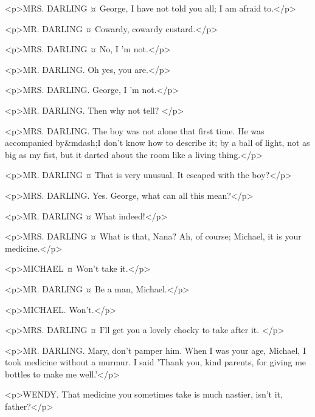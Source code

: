 
<p>MRS. DARLING ¤
George, I have not told you all; I am afraid to.</p>

<p>MR. DARLING ¤
Cowardy, cowardy custard.</p>

<p>MRS. DARLING ¤
No, I 'm not.</p>

<p>MR. DARLING. Oh yes, you are.</p>

<p>MRS. DARLING. George, I 'm not.</p>

<p>MR. DARLING. Then why not tell?
</p>

<p>MRS. DARLING. The boy was not alone that first time. He was accompanied by&mdash;I don't know how to describe it; by a ball of light, not as big as my fist, but it darted about the room like a living thing.</p>

<p>MR. DARLING ¤
That is very unusual. It escaped with the boy?</p>

<p>MRS. DARLING. Yes.
George, what can all this mean?</p>

<p>MR. DARLING ¤
What indeed!</p>


<p>MRS. DARLING ¤
What is that, Nana? Ah, of course; Michael, it is your medicine.</p>

<p>MICHAEL ¤
Won't take it.</p>

<p>MR. DARLING ¤
Be a man, Michael.</p>

<p>MICHAEL. Won't.</p>

<p>MRS. DARLING ¤
I'll get you a lovely chocky to take after it.
</p>

<p>MR. DARLING. Mary, don't pamper him. When I was your age, Michael, I took medicine without a murmur. I said 'Thank you, kind parents, for giving me bottles to make me well.'</p>


<p>WENDY. That medicine you sometimes take is much nastier, isn't it, father?</p>

